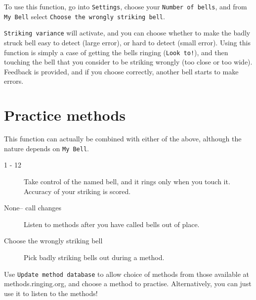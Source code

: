 \documentclass[11pt]{article} %
\newcommand{\setting}{\texttt}
\begin{document}
To use this function, go into \setting{Settings}, choose your \setting{Number of bells}, and from \setting{My Bell} select \setting{Choose the wrongly striking bell}.

\setting{Striking variance} will activate, and you can choose whether to make the badly struck bell easy to detect (large error), or hard to detect (small error).
Using this function is simply a case of getting the bells ringing (\setting{Look to!}), and then touching the bell that you consider to be striking wrongly (too close or too wide).
Feedback is provided, and if you choose correctly, another bell starts to make errors.

\section{Practice methods}

This function can actually be combined with either of the above, although the nature depends on \setting{My Bell}.

\begin{description}

\item[1 - 12] Take control of the named bell, and it rings only when you touch it.  Accuracy of your striking is scored.

\item[None-- call changes] Listen to methods after you have called bells out of place.

\item[Choose the wrongly striking bell] Pick badly striking bells out during a method.

\end{description}

Use \setting{Update method database} to allow choice of methods from those available at methods.ringing.org, and choose a method to practise.
Alternatively, you can just use it to listen to the methods!
\end{document}
